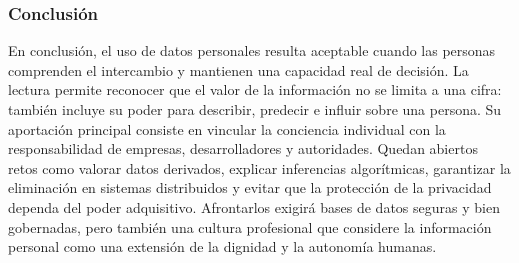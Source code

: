 \subsubsection*{Conclusión}

En conclusión, el uso de datos personales resulta aceptable cuando las personas
comprenden el intercambio y mantienen una capacidad real de decisión. La
lectura permite reconocer que el valor de la información no se limita a una
cifra: también incluye su poder para describir, predecir e influir sobre una
persona. Su aportación principal consiste en vincular la conciencia individual
con la responsabilidad de empresas, desarrolladores y autoridades. Quedan
abiertos retos como valorar datos derivados, explicar inferencias algorítmicas,
garantizar la eliminación en sistemas distribuidos y evitar que la protección de
la privacidad dependa del poder adquisitivo. Afrontarlos exigirá bases de datos
seguras y bien gobernadas, pero también una cultura profesional que considere la
información personal como una extensión de la dignidad y la autonomía humanas.

